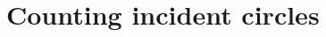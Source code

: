 \documentclass[11pt,oneside]{amsart}
\newtheorem{thm}{Theorem}
\theoremstyle{definition}
\theoremstyle{remark}
\numberwithin{equation}{section}
\begin{document}











\section{Counting incident circles}
\end{document}
